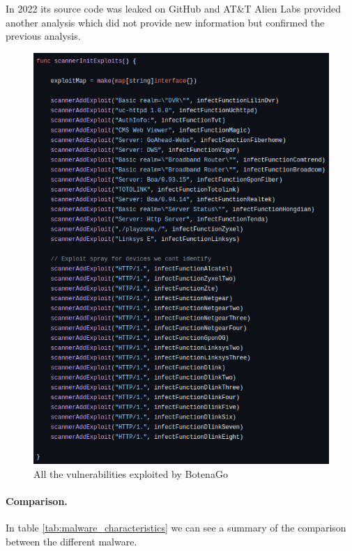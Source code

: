 In 2022 its source code was leaked on GitHub and AT\&T Alien Labs provided another analysis which did not provide new information but confirmed the previous analysis. \cite{att-botenago-reverse,att-botenago-sourcecode}

\begin{figure}[ht]
    \centering
    \includegraphics[scale=0.5]{resources/images/all-vulnerabilities-botenago.png}
    \caption{All the vulnerabilities exploited by BotenaGo}
    \label{fig:all-vulnerabilities-botenago}
\end{figure}

\paragraph{Comparison.} In table \ref{tab:malware_characteristics} we can see a summary of the comparison between the different malware.


